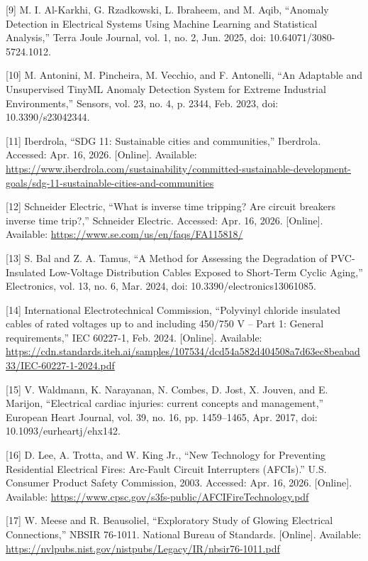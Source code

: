 \begin{thesisreferences}
{[}9{]} M. I. Al-Karkhi, G. Rzadkowski, L. Ibraheem, and M. Aqib,
``Anomaly Detection in Electrical Systems Using Machine Learning and
Statistical Analysis,'' Terra Joule Journal, vol. 1, no. 2, Jun. 2025,
doi: 10.64071/3080-5724.1012.

{[}10{]} M. Antonini, M. Pincheira, M. Vecchio, and F. Antonelli, ``An
Adaptable and Unsupervised TinyML Anomaly Detection System for Extreme
Industrial Environments,'' Sensors, vol. 23, no. 4, p. 2344, Feb. 2023,
doi: 10.3390/s23042344.

{[}11{]} Iberdrola, ``SDG 11: Sustainable cities and communities,''
Iberdrola. Accessed: Apr. 16, 2026. {[}Online{]}. Available:
\url{https://www.iberdrola.com/sustainability/committed-sustainable-development-goals/sdg-11-sustainable-cities-and-communities}

{[}12{]} Schneider Electric, ``What is inverse time tripping? Are
circuit breakers inverse time trip?,'' Schneider Electric. Accessed:
Apr. 16, 2026. {[}Online{]}. Available:
\url{https://www.se.com/us/en/faqs/FA115818/}

{[}13{]} S. Bal and Z. A. Tamus, ``A Method for Assessing the
Degradation of PVC-Insulated Low-Voltage Distribution Cables Exposed to
Short-Term Cyclic Aging,'' Electronics, vol. 13, no. 6, Mar. 2024, doi:
10.3390/electronics13061085.

{[}14{]} International Electrotechnical Commission, ``Polyvinyl chloride
insulated cables of rated voltages up to and including 450/750 V -- Part
1: General requirements,'' IEC 60227-1, Feb. 2024. {[}Online{]}.
Available:
\url{https://cdn.standards.iteh.ai/samples/107534/dcd54a582d404508a7d63ec8beabad33/IEC-60227-1-2024.pdf}

{[}15{]} V. Waldmann, K. Narayanan, N. Combes, D. Jost, X. Jouven, and
E. Marijon, ``Electrical cardiac injuries: current concepts and
management,'' European Heart Journal, vol. 39, no. 16, pp. 1459--1465,
Apr. 2017, doi: 10.1093/eurheartj/ehx142.

{[}16{]} D. Lee, A. Trotta, and W. King Jr., ``New Technology for
Preventing Residential Electrical Fires: Arc-Fault Circuit Interrupters
(AFCIs).'' U.S. Consumer Product Safety Commission, 2003. Accessed: Apr.
16, 2026. {[}Online{]}. Available:
\url{https://www.cpsc.gov/s3fs-public/AFCIFireTechnology.pdf}

{[}17{]} W. Meese and R. Beausoliel, ``Exploratory Study of Glowing
Electrical Connections,'' NBSIR 76-1011. National Bureau of Standards.
{[}Online{]}. Available:
\url{https://nvlpubs.nist.gov/nistpubs/Legacy/IR/nbsir76-1011.pdf}


\end{thesisreferences}
